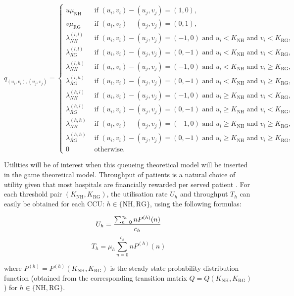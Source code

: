 \documentclass{article}
\newcommand{\NH}{\text{NH}}
\newcommand{\RG}{\text{RG}}
\begin{document}
\begin{equation}
q_{(u_i,v_i),(u_j,v_j)}=\begin{cases} u\mu_{\NH} & \text{ if  } (u_i,v_i)-(u_j,v_j)=(1,0),\\
 v\mu_{\RG} & \text{ if  } (u_i,v_i)-(u_j,v_j)=(0,1),\\
 \lambda_{NH}^{(l,l)} & \text{ if  } (u_i,v_i)-(u_j,v_j)=(-1,0)  \text{ and  } u_i < K_{\NH}  \text{ and  } v_i < K_{\RG},\\
 \lambda_{RG}^{(l,l)} & \text{ if  } (u_i,v_i)-(u_j,v_j)=(0,-1)  \text{ and  } u_i < K_{\NH}  \text{ and  } v_i < K_{\RG},\\
\lambda_{NH}^{(l,h)} & \text{ if  } (u_i,v_i)-(u_j,v_j)=(-1,0) \text{ and  } u_i < K_{\NH}  \text{ and  } v_i \geq K_{\RG},\\
\lambda_{RG}^{(l,h)} & \text{ if  } (u_i,v_i)-(u_j,v_j)=(0,-1) \text{ and  } u_i < K_{\NH}  \text{ and  } v_i \geq K_{\RG},\\
\lambda_{NH}^{(h,l)} & \text{ if  } (u_i,v_i)-(u_j,v_j)=(-1,0) \text{ and  } u_i \geq K_{\NH}  \text{ and  } v_i < K_{\RG},\\
\lambda_{RG}^{(h,l)} & \text{ if  } (u_i,v_i)-(u_j,v_j)=(0,-1) \text{ and  } u_i \geq K_{\NH}  \text{ and  } v_i < K_{\RG},\\
\lambda_{NH}^{(h,h)} & \text{ if  } (u_i,v_i)-(u_j,v_j)=(-1,0) \text{ and  } u_i \geq K_{\NH}  \text{ and  } v_i \geq K_{\RG},\\
\lambda_{RG}^{(h,h)} & \text{ if  } (u_i,v_i)-(u_j,v_j)=(0,-1) \text{ and  } u_i \geq K_{\NH}  \text{ and  } v_i \geq K_{\RG},\\
0 & \text{ otherwise}.
\end{cases}
\end{equation}

Utilities will be of interest when this queueing theoretical model will be inserted in the game theoretical model.
Throughput of patients is a natural choice of utility given that most hospitals are financially rewarded per served patient \cite{Pate2009}.
For each threshold pair $(K_{\NH},K_{\RG})$, the utilisation rate $U_h$ and throughput $T_h$ can easily be obtained for each CCU: $h\in\{\text{NH},\text{RG}\}$, using the following formulas:

$$U_{h}={{\sum_{n=0}^{c_h} nP^{(h)}(n)}\over{c_{h}}}$$
$$T_{h}=\mu_h \sum _{n=0}^{c_h} nP^{(h)}(n)$$

where $P^{(h)}=P^{(h)}(K_{\NH},K_{\RG})$ is the steady state probability distribution function (obtained from the corresponding transition matrix $Q=Q(K_{\NH},K_{\RG})$) for $h\in\{\text{NH},\text{RG}\}$.
\end{document}

